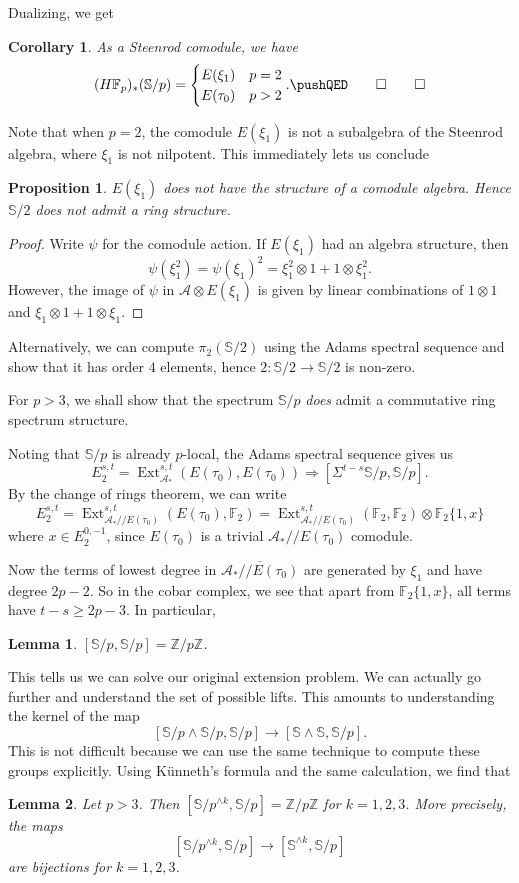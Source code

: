 \documentclass{shortart}
\newtheorem*{prop}{Proposition}
\newtheorem*{lemma}{Lemma}
\newtheorem*{cor}{Corollary}
\theoremstyle{definition}
\newcommand\Sph{\mathbb{S}}
\newcommand\F{\mathbb{F}}
\newcommand\Z{\mathbb{Z}}
\newcommand\qq{/\!\!/}
\DeclareMathOperator\Ext{Ext}
\begin{document}
Dualizing, we get
\begin{cor}
  As a Steenrod comodule, we have
  \[
    (H\F_p)_*(\Sph/p) =
    \begin{cases}
      E(\xi_1) & p = 2\\
      E(\tau_0) & p > 2
    \end{cases}.\fakeqed
  \]
\end{cor}
Note that when $p = 2$, the comodule $E(\xi_1)$ is not a subalgebra of the Steenrod algebra, where $\xi_1$ is not nilpotent. This immediately lets us conclude

\begin{prop}
  $E(\xi_1)$ does not have the structure of a comodule algebra. Hence $\Sph/2$ does not admit a ring structure.
\end{prop}

\begin{proof}
  Write $\psi$ for the comodule action. If $E(\xi_1)$ had an algebra structure, then
  \[
    \psi(\xi_1^2) = \psi(\xi_1)^2 = \xi_1^2 \otimes 1 + 1 \otimes \xi_1^2.
  \]
  However, the image of $\psi$ in $\mathcal{A} \otimes E(\xi_1)$ is given by linear combinations of $1 \otimes 1$ and $\xi_1 \otimes 1 + 1 \otimes \xi_1$.
\end{proof}

Alternatively, we can compute $\pi_2(\Sph/2)$ using the Adams spectral sequence and show that it has order $4$ elements, hence $2: \Sph/2 \to \Sph/2$ is non-zero.

For $p > 3$, we shall show that the spectrum $\Sph/p$ \emph{does} admit a commutative ring spectrum structure.

Noting that $\Sph/p$ is already $p$-local, the Adams spectral sequence gives us
\[
  E_2^{s, t} = \Ext^{s, t}_{\mathcal{A}_*} (E(\tau_0), E(\tau_0)) \Rightarrow [\Sigma^{t - s} \Sph/p, \Sph/p].
\]
By the change of rings theorem, we can write
\[
  E_2^{s, t} = \Ext^{s, t}_{\mathcal{A}_*\qq E(\tau_0)} (E(\tau_0), \F_2) = \Ext^{s, t}_{\mathcal{A}_*\qq E(\tau_0)} (\F_2, \F_2) \otimes \F_2\{1, x\}
\]
where $x \in E_2^{0, -1}$, since $E(\tau_0)$ is a trivial $\mathcal{A}_*\qq E(\tau_0)$ comodule.

Now the terms of lowest degree in $\overline{\mathcal{A}_*\qq E(\tau_0)}$ are generated by $\xi_1$ and have degree $2p - 2$. So in the cobar complex, we see that apart from $\F_2\{1, x\}$, all terms have $t - s \geq 2p - 3$. In particular,
\begin{lemma}
  $[\Sph/p, \Sph/p] = \Z/p\Z$.\fakeqed
\end{lemma}
This tells us we can solve our original extension problem. We can actually go further and understand the set of possible lifts. This amounts to understanding the kernel of the map
\[
  [\Sph/p\wedge \Sph/p, \Sph/p] \to [\Sph \wedge \Sph, \Sph/p].
\]
This is not difficult because we can use the same technique to compute these groups explicitly. Using K\"unneth's formula and the same calculation, we find that
\begin{lemma}
  Let $p > 3$. Then $[\Sph/p^{\wedge k}, \Sph/p] = \Z/p\Z$ for $k = 1, 2, 3$. More precisely, the maps
  \[
    [\Sph/p^{\wedge k}, \Sph/p] \to [\Sph^{\wedge k}, \Sph/p]
  \]
  are bijections for $k = 1, 2, 3$.\fakeqed
\end{lemma}
\end{document}
